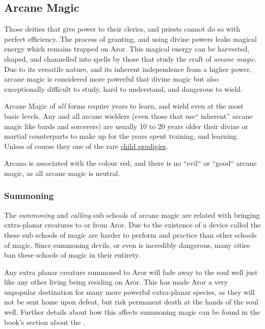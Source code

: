 \subsection{Arcane Magic}
\label{sec:Arcane Magic}

Those deities that give power to their clerics, and priests cannot do so with
perfect efficiency. The process of granting, and using divine powers leaks
magical energy which remains trapped on Aror. This magical energy can be
harvested, shaped, and channelled into spells by those that study the craft of
\emph{arcane magic}. Due to its versatile nature, and its inherent
independence from a higher power, arcane magic is considered more powerful
that divine magic but also exceptionally difficult to study, hard to
understand, and dangerous to wield.

Arcane Magic of \emph{all} forms require years to learn, and wield even at 
the most basic levels. Any and all arcane wielders (even those that use``
inherent'' arcane magic like bards and sorcerers) are usually 10 to 20 
years older their divine or martial counterparts to make up for the years 
spent training, and learning. Unless of course they one of the rare 
\hyperref[sec:Graham Balance]{child prodigies}.

Arcana is associated with the colour red, and there is no ``evil`` or ``good``
arcane magic, as all arcane magic is neutral.

\subsubsection{Summoning}
\label{sec:Summoning}

The \emph{summoning} and \emph{calling} sub schools of arcane magic are
related with bringing extra-planar creatures to or from Aror. Due to the
existence of a device called the  these sub schools of
magic are harder to perform and practice than other schools of magic. Since
summoning devils, or even  is incredibly dangerous, many
cities ban these schools of magic in their entirety.

Any extra planar creature summoned to Aror will fade away to the soul well
just like any other living being residing on Aror. This has made Aror a very
unpopular destination for many more powerful extra-planar species, as they
will not be sent home upon defeat, but risk permanent death at the hands of
the soul well. Further details about how this affects summoning magic can
be found in the book's section about the .

